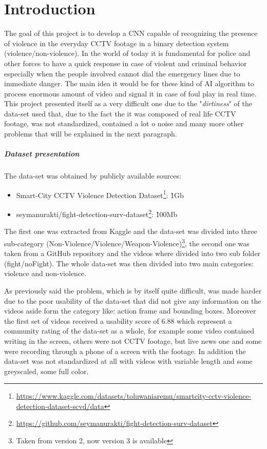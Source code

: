 \chapter{Introduction}
The goal of this project is to develop a CNN capable of recognizing the presence of violence in the everyday CCTV footage in a binary detection system (violence/non-violence). In the world of today it is fundamental for police and other forces to have a quick response in case of violent and criminal behavior especially when the people involved cannot dial the emergency lines due to immediate danger. The main idea it would be for these kind of AI algorithm to process enormous amount of video and signal it in case of foul play in real time. This project presented itself as a very difficult one due to the "\textit{dirtiness}" of the data-set used that, due to the fact the it was composed of real life CCTV footage, was not standardized, contained a lot o noise and many more other problems that will be explained in the next paragraph.

\paragraph{Dataset presentation}
The data-set was obtained by publicly available sources:
\begin{itemize}
	\item Smart-City CCTV Violence Detection Dataset\footnote{\url{https://www.kaggle.com/datasets/toluwaniaremu/smartcity-cctv-violence-detection-dataset-scvd/data}}: \~1Gb
	\item seymanurakti/fight-detection-surv-dataset\footnote{\url{https://github.com/seymanurakti/fight-detection-surv-dataset}}: \~100Mb
\end{itemize}

The first one was extracted from Kaggle and the data-set was divided into three sub-category (Non-Violence/Violence/Weapon-Violence)\footnote{Taken from version 2, now version 3 is available}, the second one was taken from a GitHub repository and the videos where divided into two sub folder (fight/noFight). The whole data-set was then divided into two main categories: violence and non-violence.

As previously said the problem, which is by itself quite difficult, was made harder due to the poor usability of the data-set that did not give any information on the videos aside form the category like: action frame and bounding boxes. Moreover the first set of videos received a usability score of 6.88 which represent a community rating of the data-set as a whole, for example some video contained writing in the screen, others were not CCTV footage, but live news one and some were recording through a phone of a screen with the footage. In addition the data-set was not standardized at all with videos with variable length and some greyscaled, some full color.
